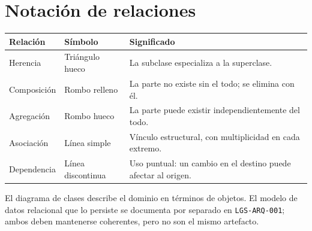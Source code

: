\documentclass[11pt,a4paper]{article}
\begin{document}
\section*{Notación de relaciones}

\begin{center}
\begin{tabularx}{\linewidth}{@{}L{3.4cm} L{3.0cm} Y@{}}
\toprule
\sffamily\bfseries\color{lgPrimario}Relación &
\sffamily\bfseries\color{lgPrimario}Símbolo &
\sffamily\bfseries\color{lgPrimario}Significado \\
\midrule
Herencia    & Triángulo hueco   & La subclase especializa a la superclase. \\
Composición & Rombo relleno     & La parte no existe sin el todo; se elimina con él. \\
Agregación  & Rombo hueco       & La parte puede existir independientemente del todo. \\
Asociación  & Línea simple      & Vínculo estructural, con multiplicidad en cada extremo. \\
Dependencia & Línea discontinua & Uso puntual: un cambio en el destino puede afectar al origen. \\
\bottomrule
\end{tabularx}
\end{center}

\begin{nota}
El diagrama de clases describe el dominio en términos de objetos. El modelo de
datos relacional que lo persiste se documenta por separado en
\texttt{LGS-ARQ-001}; ambos deben mantenerse coherentes, pero no son el mismo
artefacto.
\end{nota}
\end{document}
